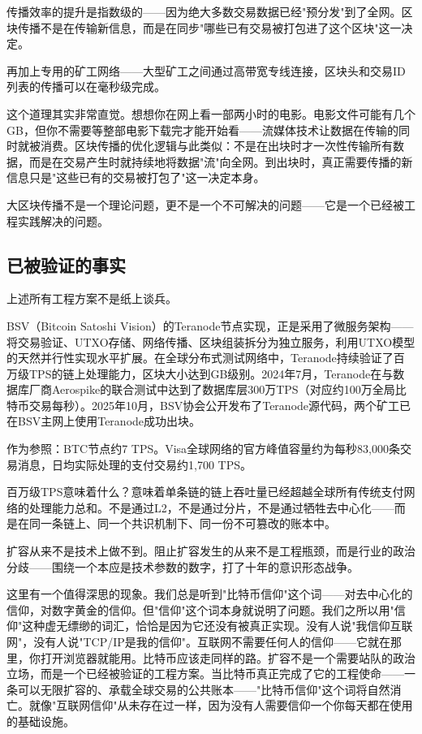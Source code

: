 \documentclass[a4paper,12pt,openany]{ctexbook}
\begin{document}
传播效率的提升是指数级的——因为绝大多数交易数据已经"预分发"到了全网。区块传播不是在传输新信息，而是在同步"哪些已有交易被打包进了这个区块"这一决定。

再加上专用的矿工网络——大型矿工之间通过高带宽专线连接，区块头和交易ID列表的传播可以在毫秒级完成。

这个道理其实非常直觉。想想你在网上看一部两小时的电影。电影文件可能有几个GB，但你不需要等整部电影下载完才能开始看——流媒体技术让数据在传输的同时就被消费。区块传播的优化逻辑与此类似：不是在出块时才一次性传输所有数据，而是在交易产生时就持续地将数据"流"向全网。到出块时，真正需要传播的新信息只是"这些已有的交易被打包了"这一决定本身。

大区块传播不是一个理论问题，更不是一个不可解决的问题——它是一个已经被工程实践解决的问题。


\subsection*{已被验证的事实}


上述所有工程方案不是纸上谈兵。

BSV（Bitcoin Satoshi Vision）的Teranode节点实现，正是采用了微服务架构——将交易验证、UTXO存储、网络传播、区块组装拆分为独立服务，利用UTXO模型的天然并行性实现水平扩展。在全球分布式测试网络中，Teranode持续验证了百万级TPS的链上处理能力，区块大小达到GB级别。2024年7月，Teranode在与数据库厂商Aerospike的联合测试中达到了数据库层300万TPS（对应约100万全局比特币交易每秒）。2025年10月，BSV协会公开发布了Teranode源代码，两个矿工已在BSV主网上使用Teranode成功出块。

作为参照：BTC节点约7 TPS。Visa全球网络的官方峰值容量约为每秒83,000条交易消息，日均实际处理的支付交易约1,700 TPS。

百万级TPS意味着什么？意味着单条链的链上吞吐量已经超越全球所有传统支付网络的处理能力总和。不是通过L2，不是通过分片，不是通过牺牲去中心化——而是在同一条链上、同一个共识机制下、同一份不可篡改的账本中。

扩容从来不是技术上做不到。阻止扩容发生的从来不是工程瓶颈，而是行业的政治分歧——围绕一个本应是技术参数的数字，打了十年的意识形态战争。

这里有一个值得深思的现象。我们总是听到"比特币信仰"这个词——对去中心化的信仰，对数字黄金的信仰。但"信仰"这个词本身就说明了问题。我们之所以用"信仰"这种虚无缥缈的词汇，恰恰是因为它还没有被真正实现。没有人说"我信仰互联网"，没有人说"TCP/IP是我的信仰"。互联网不需要任何人的信仰——它就在那里，你打开浏览器就能用。比特币应该走同样的路。扩容不是一个需要站队的政治立场，而是一个已经被验证的工程方案。当比特币真正完成了它的工程使命——一条可以无限扩容的、承载全球交易的公共账本——"比特币信仰"这个词将自然消亡。就像"互联网信仰"从未存在过一样，因为没有人需要信仰一个你每天都在使用的基础设施。
\end{document}
